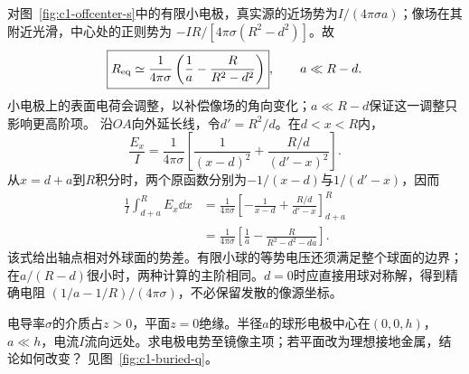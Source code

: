 \begin{solution}
对图~\ref{fig:c1-offcenter-s}中的有限小电极，真实源的近场势为$I/(4\pi\sigma a)$；像场在其附近光滑，中心处的正则势为
$-IR/[4\pi\sigma(R^2-d^2)]$。故
\[
 \boxed{R_{\rm eq}\simeq\frac1{4\pi\sigma}
 \left(\frac1a-\frac R{R^2-d^2}\right)},\qquad a\ll R-d.
\]
小电极上的表面电荷会调整，以补偿像场的角向变化；$a\ll R-d$保证这一调整只影响更高阶项。
沿$OA$向外延长线，令$d'=R^2/d$。在$d<x<R$内，
\[
 \frac{E_x}{I}=\frac1{4\pi\sigma}
 \left[\frac1{(x-d)^2}+\frac{R/d}{(d'-x)^2}\right].
\]
从$x=d+a$到$R$积分时，两个原函数分别为$-1/(x-d)$与$1/(d'-x)$，因而
\[
 \begin{aligned}
 \frac1I\int_{d+a}^R E_x\dd x
 &=\frac1{4\pi\sigma}\left[-\frac1{x-d}
 +\frac{R/d}{d'-x}\right]_{d+a}^{R}\\
 &=\frac1{4\pi\sigma}\left[
 \frac1a-\frac R{R^2-d^2-da}\right].
 \end{aligned}
\]
该式给出轴点相对外球面的势差。有限小球的等势电压还须满足整个球面的边界；在$a/(R-d)$很小时，两种计算的主阶相同。$d=0$时应直接用球对称解，得到精确电阻
$(1/a-1/R)/(4\pi\sigma)$，不必保留发散的像源坐标。
\end{solution}

\begin{example}[绝缘平面附近的球形电极]\label{ex:c1-buried}
电导率$\sigma$的介质占$z>0$，平面$z=0$绝缘。半径$a$的球形电极中心在$(0,0,h)$，$a\ll h$，电流$I$流向远处。求电极电势至镜像主项；若平面改为理想接地金属，结论如何改变？ 见图~\ref{fig:c1-buried-q}。
\end{example}

